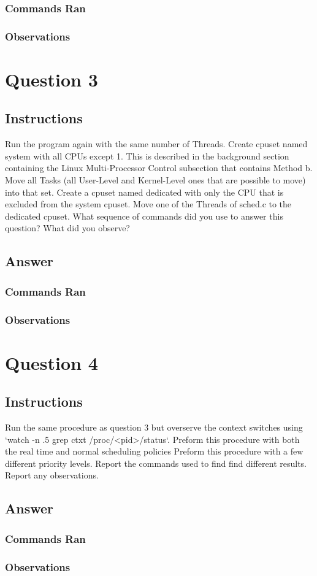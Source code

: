 \documentclass{assignment-x}
\begin{document}
\subsubsection{Commands Ran}
\subsubsection{Observations}

\section{Question 3}
\subsection{Instructions}
Run the program again with the same number of Threads. Create cpuset named system with all CPUs except 1. This is described in the background section containing the Linux Multi-Processor Control subsection that contains Method b. Move all Tasks (all User-Level and Kernel-Level ones that are possible to move) into that set. Create a cpuset named dedicated with only the CPU that is excluded from the system cpuset. Move one of the Threads of sched.c to the dedicated cpuset. What sequence of commands did you use to answer this question? What did you observe?
\subsection{Answer}
\subsubsection{Commands Ran}
\subsubsection{Observations}

\section{Question 4}
\subsection{Instructions}
Run the same procedure as question 3 but overserve the context switches using `watch -n .5 grep ctxt /proc/<pid>/status`. 
Preform this procedure with both the real time and normal scheduling policies
Preform this procedure with a few different priority levels.
Report the commands used to find find different results.
Report any observations.
\subsection{Answer}
\subsubsection{Commands Ran}
\subsubsection{Observations}
\end{document}
